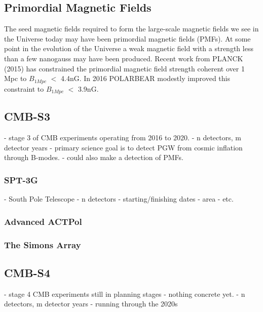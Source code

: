 \subsection{Primordial Magnetic Fields}

The seed magnetic fields required to form the large-scale magnetic fields we see in the Universe today may have been primordial magnetic fields (PMFs). At some point in the evolution of the Universe a weak magnetic field with a strength less than a few nanogauss may have been produced. Recent work from PLANCK (2015) has constrained the primordial magnetic field strength coherent over 1 Mpc to $B_{1Mpc}$ $<$ 4.4nG. In 2016 POLARBEAR modestly improved this constraint to $B_{1Mpc}$ $<$ 3.9nG.

\iffalse
	- seed magnetic field produced in the early universe
	- undetected
	- predicted magnitude of < 1 nG.
	- evolves through magnetohydrodynamical processes
\fi


\subsection{CMB-S3}
	- stage 3 of CMB experiments operating from 2016 to 2020.
	- n detectors, m detector years
	- primary science goal is to detect PGW from cosmic inflation through B-modes.
	- could also make a detection of PMFs.
\subsubsection{SPT-3G}
	- South Pole Telescope
	- n detectors
	- starting/finishing dates
	- area
	- etc.
\subsubsection{Advanced ACTPol}
\subsubsection{The Simons Array}
\subsection{CMB-S4}
	- stage 4 CMB experiments still in planning stages - nothing concrete yet.
	- n detectors, m detector years
	- running through the 2020s